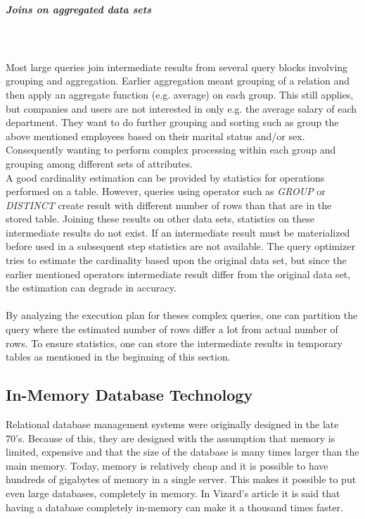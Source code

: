 \documentclass{cslthse-msc}
\begin{document}
\subparagraph{Joins on aggregated data sets}\mbox{}\\\\
Most large queries join intermediate results from several query blocks involving grouping and aggregation. Earlier aggregation meant grouping of a relation and then apply an aggregate function (e.g. average) on each group. This still applies, but companies and users are not interested in only e.g. the average salary of each department. They want to do further grouping and sorting such as group the above mentioned employees based on their marital status and/or sex\cite{partioned}. Consequently wanting to perform complex processing within each group and grouping among different sets of attributes.\\ A good cardinality estimation can be provided by statistics for operations performed on a table. However, queries using operator such as \textit{GROUP} or \textit{DISTINCT} create result with different number of rows than that are in the stored table. Joining these results on other data sets, statistics on these intermediate results do not exist. If an intermediate result must be materialized before used in a subsequent step statistics are not available. The query optimizer tries to estimate the cardinality based upon the original data set, but since the earlier mentioned operators intermediate result differ from the original data set, the estimation can degrade in accuracy.\\\\ By analyzing the execution plan for theses complex queries, one can partition the query where the estimated number of rows differ a lot from actual number of rows. To ensure statistics, one can store the intermediate results in temporary tables as mentioned in the beginning of this section.     

 
\subsection{In-Memory Database Technology}
Relational database management systems were originally designed in the late 70's\cite{Nevarez}. Because of this, they are designed with the assumption that memory is limited, expensive and that the size of the database is many times larger than the main memory. Today, memory is relatively cheap and it is possible to have hundreds of gigabytes of memory in a single server. This makes it possible to put even large databases, completely in memory. In Vizard's article\cite{Vizard12} it is said that having a database completely in-memory can make it a thousand times faster.
\end{document}
